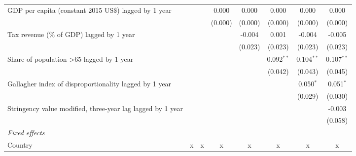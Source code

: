 \begin{tabular}{lccccccc}
   GDP per capita (constant 2015 US\$) lagged by 1 year                                     &              &               & 0.000         & 0.000         & 0.000        & 0.000        & 0.000\\   
                                                                                            &              &               & (0.000)       & (0.000)       & (0.000)      & (0.000)      & (0.000)\\   
   Tax revenue (\% of GDP) lagged by 1 year                                                 &              &               &               & -0.004        & 0.001        & -0.004       & -0.005\\   
                                                                                            &              &               &               & (0.023)       & (0.023)      & (0.023)      & (0.023)\\   
   Share of population >65 lagged by 1 year                                                 &              &               &               &               & 0.092$^{**}$ & 0.104$^{**}$ & 0.107$^{**}$\\   
                                                                                            &              &               &               &               & (0.042)      & (0.043)      & (0.045)\\   
   Gallagher index of disproportionality lagged by 1 year                                   &              &               &               &               &              & 0.050$^{*}$  & 0.051$^{*}$\\   
                                                                                            &              &               &               &               &              & (0.029)      & (0.030)\\   
   Stringency value modified, three-year lag lagged by 1 year                               &              &               &               &               &              &              & -0.003\\   
                                                                                            &              &               &               &               &              &              & (0.058)\\   
   \emph{Fixed effects}\\
   Country                                                                                  & x            & x             & x             & x             & x            & x            & x\\  

\end{tabular}
